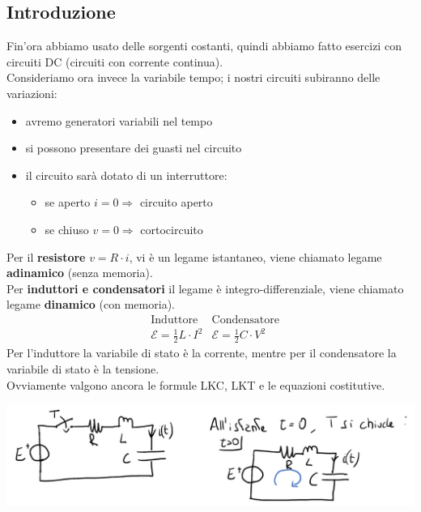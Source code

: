 \documentclass{article}
\begin{document}
\subsection{Introduzione}
Fin'ora abbiamo usato delle sorgenti costanti, quindi abbiamo fatto esercizi con circuiti DC (circuiti con corrente continua).\\
Consideriamo ora invece la variabile tempo; i nostri circuiti subiranno delle variazioni:
\begin{itemize}
    \item avremo generatori variabili nel tempo
    \item si possono presentare dei guasti nel circuito
    \item il circuito sarà dotato di un interruttore:
    \begin{itemize}
        \item se aperto $i=0 \Rightarrow$ circuito aperto
        \item se chiuso $v=0 \Rightarrow$ cortocircuito
    \end{itemize}
\end{itemize}
Per il \textbf{resistore} $v=R \cdot i$, vi è un legame istantaneo, viene chiamato legame \textbf{adinamico} (senza memoria).\\
Per \textbf{induttori e condensatori} il legame è integro-differenziale, viene chiamato legame \textbf{dinamico} (con memoria).
\vspace*{0.2cm}\\
\begin{align*}
    &\text{Induttore} & \text{Condensatore}\\
    &\mathcal{E} = \frac{1}{2} L \cdot I^2 & \mathcal{E} = \frac{1}{2}C \cdot V^2
\end{align*}
Per l'induttore la variabile di stato è la corrente, mentre per il condensatore la variabile di stato è la tensione.
\vspace*{0.2cm}\\
Ovviamente valgono ancora le formule LKC, LKT e le equazioni costitutive.
\begin{center}
    \includegraphics[scale=0.3]{Image/Es_Trans_0.png}
\end{center}
\end{document}
